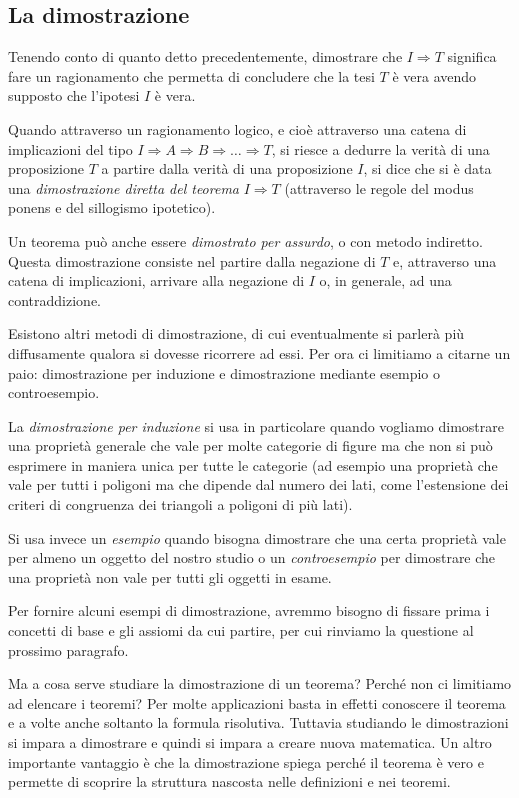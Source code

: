 {\subsection{La dimostrazione}

Tenendo conto di quanto detto precedentemente, dimostrare che  $I\Rightarrow T$ significa fare un ragionamento che permetta di concludere che la tesi $ T $ è vera avendo supposto che l'ipotesi $ I $ è vera.

Quando attraverso un ragionamento logico, e cioè attraverso una catena di implicazioni del tipo  $I\Rightarrow A\Rightarrow B\Rightarrow \ldots \Rightarrow T$, si riesce a dedurre la verità di una proposizione $ T $ a partire dalla verità di una proposizione $ I $, si dice che si è data una \emph{dimostrazione diretta del teorema}  $I\Rightarrow T$ (attraverso le regole del modus ponens e del sillogismo ipotetico).

Un teorema può anche essere \emph{dimostrato per assurdo}, o con metodo indiretto. Questa dimostrazione consiste nel partire dalla negazione di $ T $ e, attraverso una catena di implicazioni, arrivare alla negazione di $ I $ o, in generale, ad una contraddizione.

Esistono altri metodi di dimostrazione, di cui eventualmente si parlerà più diffusamente qualora si dovesse ricorrere ad essi. Per ora ci limitiamo a citarne un paio: dimostrazione per induzione e dimostrazione mediante esempio o controesempio.

La \emph{dimostrazione per induzione} si usa in particolare quando vogliamo dimostrare una proprietà generale che vale per molte categorie di figure ma che non si può esprimere in maniera unica per tutte le categorie (ad esempio una proprietà che vale per tutti i poligoni ma che dipende dal numero dei lati, come l'estensione dei criteri di congruenza dei triangoli a poligoni di più lati).

Si usa invece un \emph{esempio} quando bisogna dimostrare che una certa proprietà vale per almeno un oggetto del nostro studio o un \emph{controesempio} per dimostrare che una proprietà non vale per tutti gli oggetti in esame.

Per fornire alcuni esempi di dimostrazione, avremmo bisogno di fissare prima i concetti di base e gli assiomi da cui partire, per cui rinviamo la questione al prossimo paragrafo.

Ma a cosa serve studiare la dimostrazione di un teorema? Perché non ci limitiamo ad elencare i teoremi? Per molte applicazioni basta in effetti conoscere il teorema e a volte anche soltanto la formula risolutiva. Tuttavia studiando le dimostrazioni si impara a dimostrare e quindi si impara a creare nuova matematica. Un altro importante vantaggio è che la dimostrazione spiega perché il teorema è vero e permette di scoprire la struttura nascosta nelle definizioni e nei teoremi.

}
